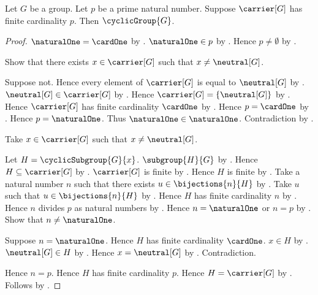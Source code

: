 \begin{theorem}\label{prime_cardinality_group_is_cyclic}
    Let $G$ be a group.
    Let $p$ be a prime natural number.
    Suppose $\carrier[G]$ has finite cardinality $p$.
    Then $\cyclicGroup{G}$.
\end{theorem}
\begin{proof}
    $\naturalOne=\cardOne$ by
        .
    $\naturalOne\in p$ by .
    Hence $p\neq\emptyset$ by .

    Show that there exists $x\in\carrier[G]$ such that
        $x\neq\neutral[G]$.
    \begin{subproof}
        Suppose not.
        Hence every element of $\carrier[G]$ is equal to $\neutral[G]$
            by \auto.
        $\neutral[G]\in\carrier[G]$ by
            .
        Hence $\carrier[G]=\{\neutral[G]\}$ by
            .
        Hence $\carrier[G]$ has finite cardinality $\cardOne$ by
            .
        Hence $p=\cardOne$ by .
        Hence $p=\naturalOne$.
        Thus $\naturalOne\in\naturalOne$.
        Contradiction by .
    \end{subproof}
    Take $x\in\carrier[G]$ such that $x\neq\neutral[G]$.

    Let $H=\cyclicSubgroup{G}{x}$.
    $\subgroup{H}{G}$ by .
    Hence $H\subseteq\carrier[G]$ by .
    $\carrier[G]$ is finite by .
    Hence $H$ is finite by .
    Take a natural number $n$ such that there exists
        $u\in\bijections{n}{H}$ by .
    Take $u$ such that $u\in\bijections{n}{H}$ by \auto.
    Hence $H$ has finite cardinality $n$ by .
    Hence $n$ divides $p$ as natural numbers by
        .
    Hence $n=\naturalOne$ or $n=p$ by .
    Show that $n\neq\naturalOne$.
    \begin{subproof}
        Suppose $n=\naturalOne$.
        Hence $H$ has finite cardinality $\cardOne$.
        $x\in H$ by .
        $\neutral[G]\in H$ by .
        Hence $x=\neutral[G]$ by
            .
        Contradiction.
    \end{subproof}
    Hence $n=p$.
    Hence $H$ has finite cardinality $p$.
    Hence $H=\carrier[G]$ by
        .
    Follows by .
\end{proof}
